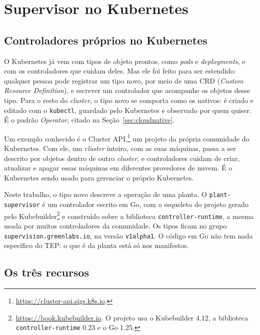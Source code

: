 \section{Supervisor no Kubernetes}
\label{sec:supervisor}

\subsection{Controladores próprios no Kubernetes}
\label{subsec:extensao}

O Kubernetes já vem com tipos de objeto prontos, como \textit{pods} e \textit{deployments}, e com os controladores que cuidam deles. Mas ele foi feito para ser estendido: qualquer pessoa pode registrar um tipo novo, por meio de uma CRD (\textit{Custom Resource Definition}), e escrever um controlador que acompanhe os objetos desse tipo. Para o resto do \textit{cluster}, o tipo novo se comporta como os nativos: é criado e editado com o \texttt{kubectl}, guardado pelo Kubernetes e observado por quem quiser. É o padrão \textit{Operator}, citado na Seção~\ref{sec:cloudnative}.

Um exemplo conhecido é o Cluster API,\footnote{\url{https://cluster-api.sigs.k8s.io}.} um projeto da própria comunidade do Kubernetes. Com ele, um \textit{cluster} inteiro, com as suas máquinas, passa a ser descrito por objetos dentro de outro \textit{cluster}, e controladores cuidam de criar, atualizar e apagar essas máquinas em diferentes provedores de nuvem. É o Kubernetes sendo usado para gerenciar o próprio Kubernetes.

Neste trabalho, o tipo novo descreve a operação de uma planta. O \texttt{plant-supervisor} é um controlador escrito em Go, com o esqueleto do projeto gerado pelo Kubebuilder\footnote{\url{https://book.kubebuilder.io}. O projeto usa o Kubebuilder 4.12, a biblioteca \texttt{controller-runtime} 0.23 e o Go 1.25.} e construído sobre a biblioteca \texttt{controller-runtime}, a mesma usada por muitos controladores da comunidade. Os tipos ficam no grupo \texttt{supervision.greenlabs.io}, na versão \texttt{v1alpha1}. O código em Go não tem nada específico do TEP: o que é da planta está só nos manifestos.

\subsection{Os três recursos}
\label{subsec:recursos}

